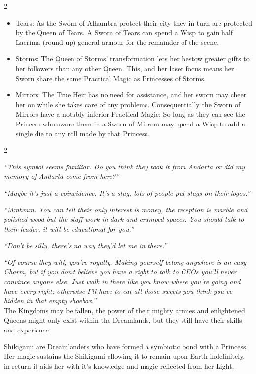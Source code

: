 \begin{multicols}{2}
\begin{itemize}
\item Tears:  As the Sworn of Alhambra protect their city they in turn are protected by the Queen of Tears. A Sworn of Tears can spend a Wisp to gain half Lacrima (round up) general armour for the remainder of the scene. 
\item Storms: The Queen of Storms' transformation lets her bestow greater gifts to her followers than any other Queen. This, and her laser focus means her Sworn share the same Practical Magic as Princesses of Storms. 
\item Mirrors: The True Heir has no need for assistance, and her sworn may cheer her on while she takes care of any problems. Consequentially the Sworn of Mirrors have a notably inferior Practical Magic: So long as they can see the Princess who swore them in a Sworn of Mirrors may spend a Wisp to add a single die to any roll made by that Princess.
\end{itemize}

\end{multicols}\label{scha:Shikigami}\begin{multicols}{2}\raggedcolumns

\noindent \textit{“This symbol seems familiar. Do you think they took it from Andarta or did my memory of Andarta come from here?”}

\textit{“Maybe it's just a coincidence. It's a stag, lots of people put stags on their logos.”}

\textit{“Mmhmm. You can tell their only interest is money, the reception is marble and polished wood but the staff work in dark and cramped spaces. You should talk to their leader, it will be educational for you.”}

\textit{“Don't be silly, there's no way they'd let me in there.”}

\textit{“Of course they will, you're royalty. Making yourself belong anywhere is an easy Charm, but if you don't believe you have a right to talk to CEOs you'll never convince anyone else. Just walk in there like you know where you're going and have every right; otherwise I'll have to eat all those sweets you think you've hidden in that empty shoebox.”}\\


\noindent The Kingdoms may be fallen, the power of their mighty armies and enlightened Queens might only exist within the Dreamlands, but they still have their skills and experience.

Shikigami are Dreamlanders who have formed a symbiotic bond with a Princess. Her magic sustains the Shikigami allowing it to remain upon Earth indefinitely, in return it aids her with it's knowledge and magic reflected from her Light.


\end{multicols}
